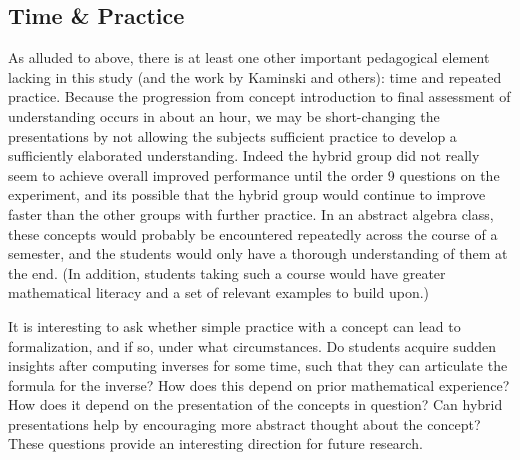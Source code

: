 \documentclass[man,10pt]{apa6}
\begin{document}
\subsection{Time \& Practice}
As alluded to above, there is at least one other important pedagogical element lacking in this study (and the work by Kaminski and others): time and repeated practice. Because the progression from concept introduction to final assessment of understanding occurs in about an hour, we may be short-changing the presentations by not allowing the subjects sufficient practice to develop a sufficiently elaborated understanding. Indeed the hybrid group did not really seem to achieve overall improved performance until the order 9 questions on the experiment, and its possible that the hybrid group would continue to improve faster than the other groups with further practice. In an abstract algebra class, these concepts would probably be encountered repeatedly across the course of a semester, and the students would only have a thorough understanding of them at the end. (In addition, students taking such a course would have greater mathematical literacy and a set of relevant examples to build upon.)\par
It is interesting to ask whether simple practice with a concept can lead to formalization, and if so, under what circumstances. Do students acquire sudden insights after computing inverses for some time, such that they can articulate the formula for the inverse? How does this depend on prior mathematical experience? How does it depend on the presentation of the concepts in question? Can hybrid presentations help by encouraging more abstract thought about the concept? These questions provide an interesting direction for future research. 
\end{document}
